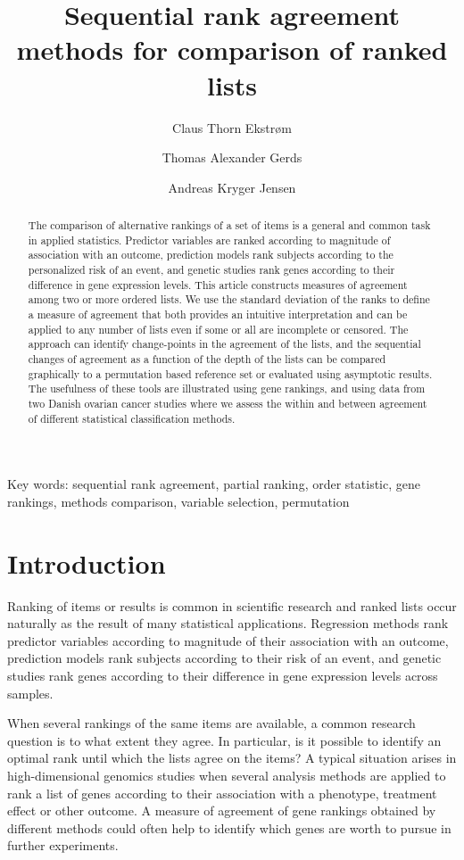 \documentclass[12pt,a4paper]{article}
\title{Sequential rank agreement methods for comparison of ranked lists}
\author{Claus Thorn Ekstrøm}
\author{Thomas Alexander Gerds}
\author{Andreas Kryger Jensen}
\affil{Biostatistics, University of Copenhagen}
\theoremstyle{plain}
\begin{document}

\maketitle

\begin{abstract}
  The comparison of alternative rankings of a set of items is a
  general and common task in applied statistics. Predictor variables
  are ranked according to magnitude of association with an outcome,
  prediction models rank subjects according to the personalized risk
  of an event, and genetic studies rank genes according to their
  difference in gene expression levels. This article constructs
  measures of agreement among two or more ordered lists. We use the
  standard deviation of the ranks to define a measure of agreement
  that both provides an intuitive interpretation and can be applied to
  any number of lists even if some or all are incomplete or
  censored. The approach can identify change-points in the agreement
  of the lists, and the sequential changes of agreement as a function
  of the depth of the lists can be compared graphically to a
  permutation based reference set or evaluated using asymptotic
  results.  The usefulness of these tools are illustrated using gene
  rankings, and using data from two Danish ovarian cancer studies
  where we assess the within and between agreement of different
  statistical classification methods.
\end{abstract}

Key words: sequential rank agreement, partial ranking, order
statistic, gene rankings, methods comparison, variable selection,
permutation

\section{Introduction}

Ranking of items or results is common in scientific research and
ranked lists occur naturally as the result of many statistical
applications. Regression methods rank predictor variables according to
magnitude of their association with an outcome, prediction models rank
subjects according to their risk of an event, and genetic studies rank
genes according to their difference in gene expression levels across
samples.


When several rankings of the same items are available, a common
research question is to what extent they agree. In particular, is it
possible to identify an optimal rank until which the lists agree on
the items?  A typical situation arises in high-dimensional genomics
studies when several analysis methods are applied to rank a list of
genes according to their association with a phenotype, treatment
effect or other outcome. A measure of agreement of gene rankings
obtained by different methods could often help to identify which genes
are worth to pursue in further experiments.
\end{document}

